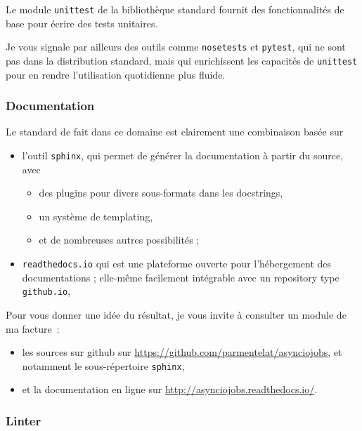     Le module \texttt{unittest} de la bibliothèque standard fournit des
fonctionnalités de base pour écrire des tests unitaires.

Je vous signale par ailleurs des outils comme \texttt{nosetests} et
\texttt{pytest}, qui ne sont pas dans la distribution standard, mais qui
enrichissent les capacités de \texttt{unittest} pour en rendre
l'utilisation quotidienne plus fluide.

    \hypertarget{documentation}{%
\subsubsection{Documentation}\label{documentation}}

    Le standard de fait dans ce domaine est clairement une combinaison basée
sur

\begin{itemize}
\tightlist
\item
  l'outil \texttt{sphinx}, qui permet de générer la documentation à
  partir du source, avec

  \begin{itemize}
  \tightlist
  \item
    des plugins pour divers sous-formats dans les docstrings,
  \item
    un système de templating,
  \item
    et de nombreuses autres possibilités ;
  \end{itemize}
\item
  \texttt{readthedocs.io} qui est une plateforme ouverte pour
  l'hébergement des documentations ; elle-même facilement intégrable
  avec un repository type \texttt{github.io},
\end{itemize}

Pour vous donner une idée du résultat, je vous invite à consulter un
module de ma facture~:

\begin{itemize}
\tightlist
\item
  les sources sur github sur
  \url{https://github.com/parmentelat/asynciojobs}, et notamment le
  sous-répertoire \texttt{sphinx},
\item
  et la documentation en ligne sur
  \url{http://asynciojobs.readthedocs.io/}.
\end{itemize}

    \hypertarget{linter}{%
\subsubsection{Linter}\label{linter}}

